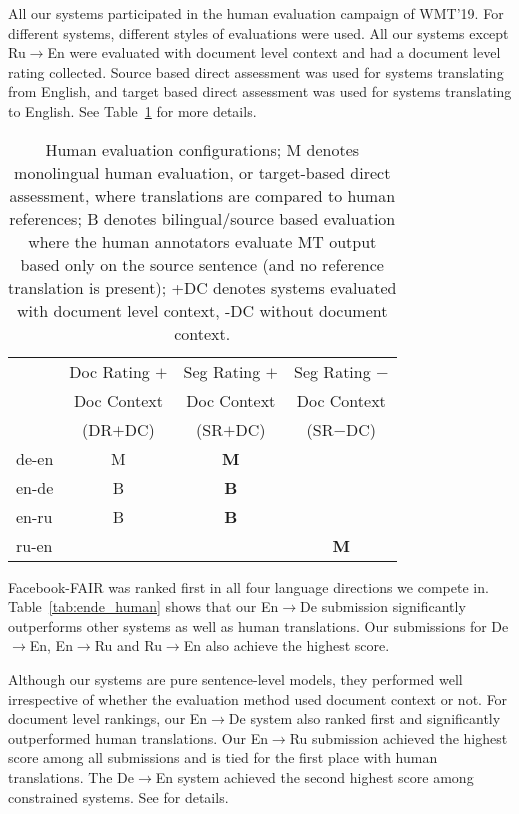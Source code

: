 \documentclass[11pt,a4paper]{article}
\newcommand{\entode}{En$\rightarrow$De}
\newcommand{\detoen}{De$\rightarrow$En}
\newcommand{\entoru}{En$\rightarrow$Ru}
\newcommand{\rutoen}{Ru$\rightarrow$En}
\begin{document}
All our systems participated in the human evaluation campaign of WMT'19.
For different systems, different styles of evaluations were used. 
All our systems except \rutoen{} were evaluated with document level context and had a document level rating collected.
Source based direct assessment was used for systems translating from English, and target based direct assessment was used for systems translating to English.
See Table~\ref{tab:types_of_human_eval} for more details. 

\begin{table}[t]
\small
\centering
\begin{tabular}{lccc}
\toprule
         & Doc Rating $+$ & Seg Rating $+$        & Seg Rating $-$\\
         & Doc Context    & Doc Context           & Doc Context \\

         & (DR$+$DC) & (SR$+$DC) & (SR$-$DC) \\ 
\midrule
de-en & M & {\bf M}  &   \\
en-de & B & {\bf B}  &   \\
en-ru & B & {\bf B}  &   \\
ru-en &  &  & {\bf M}  \\
\bottomrule
\end{tabular}
\caption{Human evaluation configurations;
M denotes monolingual human evaluation, or target-based direct assessment, where translations are compared to human references; 
B denotes bilingual/source based evaluation where the human annotators evaluate MT
output based only on the source sentence (and no reference translation is present); 
+DC denotes systems evaluated with document level context, 
-DC without document context.}
\label{tab:types_of_human_eval}
\end{table}

Facebook-FAIR was ranked first in all four language directions we compete in. 
Table~\ref{tab:ende_human} shows that our \entode{} submission significantly outperforms other systems as well as human translations. 
Our submissions for \detoen{}, \entoru{} and \rutoen{} also achieve the highest score. 

Although our systems are pure sentence-level models, they performed well irrespective of whether the evaluation method used document context or not. 
For document level rankings, our \entode{} system also ranked first and significantly outperformed human translations. 
Our \entoru{} submission achieved the highest score among all submissions and is tied for the first place with human translations. 
The \detoen{} system achieved the second highest score among constrained systems. See \citep{bojar-wmt19} for details.
\end{document}
